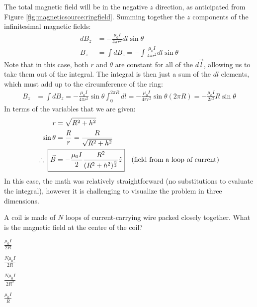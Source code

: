 The total magnetic field will be in the negative $z$ direction, as anticipated from Figure \ref{fig:magneticsource:ringfield}. Summing together the $z$ components of the infinitesimal magnetic fields:
\begin{align*}
dB_z &= -\frac{\mu_0 I}{4\pi r^2}dl\sin\theta\\
B_z &= \int dB_z =-\int \frac{\mu_0 I}{4\pi r^2}dl\sin\theta
\end{align*}
Note that in this case, both $r$ and $\theta$ are constant for all of the $d\vec l$, allowing us to take them out of the integral. The integral is then just a sum of the $dl$ elements, which must add up to the circumference of the ring:
\begin{align*}
B_z &= \int dB_z = -\frac{\mu_0 I}{4\pi r^2}\sin\theta \int_0^{2\pi R} dl=-\frac{\mu_0 I}{4\pi r^2}\sin\theta (2\pi R)=-\frac{\mu_0 I}{2r^2}R\sin\theta
\end{align*}
In terms of the variables that we are given:
\begin{align*}
r &= \sqrt{R^2+h^2}\\
\sin\theta &=\frac{R}{r}=\frac{R}{\sqrt{R^2+h^2}}\\
\therefore\;\; \Aboxed{\vec B &= -\frac{\mu_0 I}{2} \frac{R^2}{(R^2+h^2)^\frac{3}{2}} \hat z}\quad\text{(field from a loop of current)}
\end{align*}
In this case, the math was relatively straightforward (no substitutions to evaluate the integral), however it is challenging to visualize the problem in three dimensions.
\begin{checkpoint}{}
	\begin{MCquestion}{A coil is made of $N$ loops of current-carrying wire packed closely together. What is the magnetic field at the centre of the coil?}
		\item $\frac{\mu_0I}{2R}$
		\item $\frac{N\mu_0I}{2R}$ \correct
		\item $\frac{N\mu_0I}{2R^2}$
		\item $\frac{\mu_0I}{R}$
	\end{MCquestion}
\end{checkpoint}

